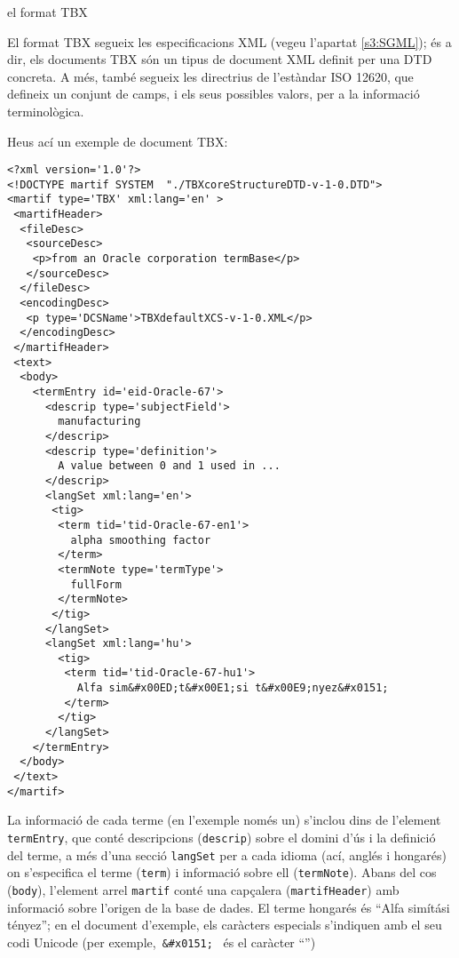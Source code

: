 \begin{persabermes}{el format TBX}
  

El format TBX segueix les especificacions XML (vegeu l'apartat 
\ref{s3:SGML}); és a dir, els documents TBX són un tipus de document
XML definit per una DTD concreta. A més, també segueix les directrius
de l'estàndar ISO 12620, que defineix un conjunt de camps, i els
seus possibles valors, per a la informació terminològica.

Heus ací un exemple de document TBX:
\begin{verbatim}
<?xml version='1.0'?>
<!DOCTYPE martif SYSTEM  "./TBXcoreStructureDTD-v-1-0.DTD">
<martif type='TBX' xml:lang='en' >
 <martifHeader>
  <fileDesc>
   <sourceDesc>
    <p>from an Oracle corporation termBase</p>
   </sourceDesc>
  </fileDesc>
  <encodingDesc>
   <p type='DCSName'>TBXdefaultXCS-v-1-0.XML</p>
  </encodingDesc>
 </martifHeader>
 <text> 
  <body>
    <termEntry id='eid-Oracle-67'>
      <descrip type='subjectField'>
        manufacturing
      </descrip>
      <descrip type='definition'>
        A value between 0 and 1 used in ...
      </descrip>
      <langSet xml:lang='en'>
       <tig>
        <term tid='tid-Oracle-67-en1'>
          alpha smoothing factor
        </term>
        <termNote type='termType'>
          fullForm
        </termNote>
       </tig>
      </langSet>
      <langSet xml:lang='hu'>
        <tig>
         <term tid='tid-Oracle-67-hu1'>
           Alfa sim&#x00ED;t&#x00E1;si t&#x00E9;nyez&#x0151; 
         </term>
        </tig>
      </langSet>
    </termEntry>
  </body> 
 </text>
</martif>
\end{verbatim}

La informació de cada terme (en l'exemple només un) s'inclou dins de
l'element {\tt termEntry}, que conté descripcions (\texttt{descrip})
sobre el domini d'ús i la definició del terme, a més d'una secció 
{\tt langSet} per a cada idioma (ací, anglés i hongarés) on
s'especifica el terme (\texttt{term}) i informació sobre ell 
(\texttt{termNote}). Abans del cos (\texttt{body}), l'element 
arrel {\tt martif} conté una capçalera (\texttt{martifHeader})
amb informació sobre l'origen de la base de dades. El terme hongarés
és ``{Alfa simítási tényez}''; en
el document d'exemple, els caràcters especials s'indiquen amb el seu
codi Unicode (per exemple,\, \verb+&#x0151;+ \ és el caràcter
``{}'')
\end{persabermes}


